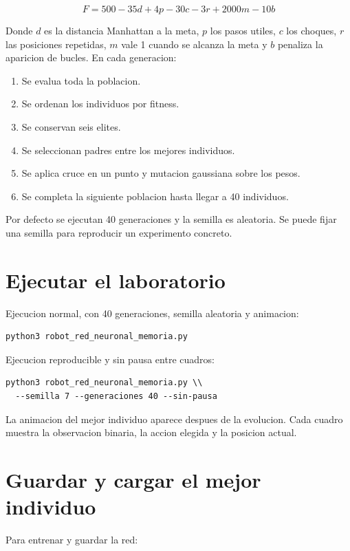 \documentclass[11pt,a4paper]{article}
\begin{document}
\[
F = 500 - 35d + 4p - 30c - 3r + 2000m - 10b
\]

Donde $d$ es la distancia Manhattan a la meta, $p$ los pasos utiles, $c$ los choques, $r$ las posiciones repetidas, $m$ vale 1 cuando se alcanza la meta y $b$ penaliza la aparicion de bucles. En cada generacion:

\begin{enumerate}[leftmargin=*]
  \item Se evalua toda la poblacion.
  \item Se ordenan los individuos por fitness.
  \item Se conservan seis elites.
  \item Se seleccionan padres entre los mejores individuos.
  \item Se aplica cruce en un punto y mutacion gaussiana sobre los pesos.
  \item Se completa la siguiente poblacion hasta llegar a 40 individuos.
\end{enumerate}

Por defecto se ejecutan 40 generaciones y la semilla es aleatoria. Se puede fijar una semilla para reproducir un experimento concreto.

\section{Ejecutar el laboratorio}
Ejecucion normal, con 40 generaciones, semilla aleatoria y animacion:

\begin{lstlisting}[style=python]
python3 robot_red_neuronal_memoria.py
\end{lstlisting}

Ejecucion reproducible y sin pausa entre cuadros:

\begin{lstlisting}[style=python]
python3 robot_red_neuronal_memoria.py \\
  --semilla 7 --generaciones 40 --sin-pausa
\end{lstlisting}

La animacion del mejor individuo aparece despues de la evolucion. Cada cuadro muestra la observacion binaria, la accion elegida y la posicion actual.

\section{Guardar y cargar el mejor individuo}
Para entrenar y guardar la red:
\end{document}
